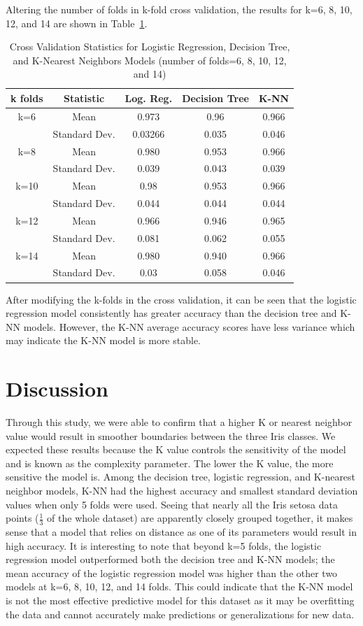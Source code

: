 \documentclass[journal]{IEEEtran}
\begin{document}
Altering the number of folds in k-fold cross validation, the results for k=6, 8, 10, 12, and 14 are shown in Table~\ref{table:MultiFoldCV}.

\begin{table}[h!]
\centering
\begin{tabular}{ c| c | c c c }
k folds & Statistic & Log. Reg. & Decision Tree & K-NN \\
\hline
k=6 & Mean & 0.973 & 0.96 & 0.966 \\
& Standard Dev. & 0.03266 & 0.035 & 0.046 \\
\hline
k=8 & Mean & 0.980 & 0.953 & 0.966 \\
& Standard Dev.& 0.039 & 0.043 & 0.039 \\
\hline
k=10 & Mean & 0.98 & 0.953 & 0.966 \\
& Standard Dev. & 0.044 & 0.044 & 0.044 \\
\hline
k=12 & Mean & 0.966 & 0.946 & 0.965 \\
& Standard Dev. & 0.081 & 0.062 & 0.055 \\
\hline
k=14 & Mean & 0.980 & 0.940 & 0.966 \\
& Standard Dev. & 0.03 & 0.058 & 0.046 \\
\end{tabular}
\caption{Cross Validation Statistics for Logistic Regression, Decision Tree, and K-Nearest Neighbors Models (number of folds=6, 8, 10, 12, and 14)}
\label{table:MultiFoldCV}
\end{table}

After modifying the k-folds in the cross validation, it can be seen that the logistic regression model consistently has greater accuracy than the decision tree and K-NN models. However, the K-NN average accuracy scores have less variance which may indicate the K-NN model is more stable. 

\section{Discussion}
Through this study, we were able to confirm that a higher K or nearest neighbor value would result in smoother boundaries between the three Iris classes. We expected these results because the K value controls the sensitivity of the model and is known as the complexity parameter. The lower the K value, the more sensitive the model is. Among the decision tree, logistic regression, and K-nearest neighbor models, K-NN had the highest accuracy and smallest standard deviation values when only 5 folds were used. Seeing that nearly all the Iris setosa data points (\(\frac{1}{3}\) of the whole dataset) are apparently closely grouped together, it makes sense that a model that relies on distance as one of its parameters would result in high accuracy. It is interesting to note that beyond k=5 folds, the logistic regression model outperformed both the decision tree and K-NN models; the mean accuracy of the logistic regression model was higher than the other two models at k=6, 8, 10, 12, and 14 folds. This could indicate that the K-NN model is not the most effective predictive model for this dataset as it may be overfitting the data and cannot accurately make predictions or generalizations for new data. 
\end{document}
